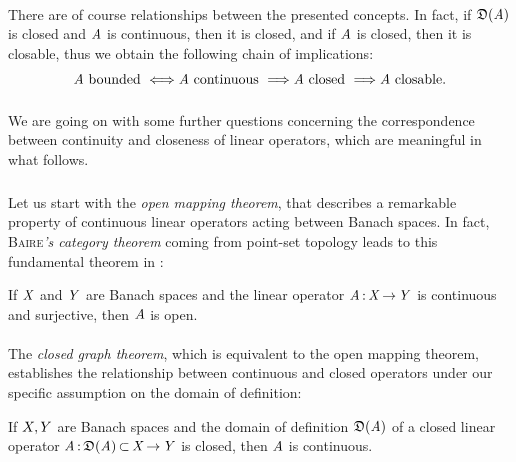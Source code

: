 \documentclass[11pt,twoside]{article}
\begin{document}
\paragraph*{}
There are of course relationships between the presented concepts.
In fact,
if $\mathfrak{D}(\mathit{A})$ is closed and $\mathit{A}$ is continuous, then it is closed,
and if $\mathit{A}$ is closed, then it is closable,
thus we obtain the following chain of implications:
\[
\mathit{A} \mbox{ bounded    } \Longleftrightarrow
\mathit{A} \mbox{ continuous } \Longrightarrow
\mathit{A} \mbox{ closed }     \Longrightarrow
\mathit{A} \mbox{ closable}.
\]

\paragraph*{}
We are going on with some further questions concerning the correspondence
between continuity and closeness of linear operators,
which are meaningful in what follows.

\subparagraph*{} %
Let us start with the \textit{open mapping theorem}, 
that describes a remarkable property of continuous linear operators
acting between Banach spaces.
In fact,
\textsc{Baire}\textit{'s category theorem} coming from point-set topology 
leads to this fundamental theorem in {\FA}:

\begin{theorem}\label{OPEN_MAPPING_THEOREM}
If $\mathit{X}$ and $\mathit{Y}$ are Banach spaces
and the linear operator $\mathit{A} {\,:\,} \mathit{X} {\,\to\,} \mathit{Y}$ is continuous and surjective,
then $\mathit{A}$ is {open}.
\end{theorem}

\paragraph*{} %
The \textit{closed graph theorem},
which is equivalent to the {open mapping theorem},
establishes the relationship between continuous and closed operators
under our specific assumption on the domain of definition:

\begin{theorem}\label{CLOSED_GRAPH_THEOREM}
If $X, Y$ are Banach spaces
and the domain of definition $\mathfrak{D}(\mathit{A})$ of a closed linear operator
$\mathit{A} {\,:\,} \mathfrak{D}(\mathit{A}) {\,\subset\,} \mathit{X} {\,\to\,} \mathit{Y}$ is closed,
then $\mathit{A}$ is continuous.
\end{theorem}

%
\end{document}
